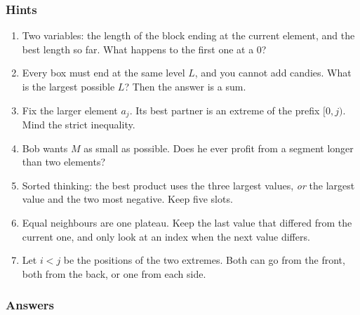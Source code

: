 \subsubsection*{Hints}
\begin{enumerate}[leftmargin=*, label=\textbf{E1.\arabic*}]
    \item Two variables: the length of the block ending at the current element, and the best length so far. What happens to the first one at a 0?
    \item Every box must end at the same level $L$, and you cannot add candies. What is the largest possible $L$? Then the answer is a sum.
    \item Fix the larger element $a_j$. Its best partner is an extreme of the prefix $[0, j)$. Mind the strict inequality.
    \item Bob wants $M$ as small as possible. Does he ever profit from a segment longer than two elements?
    \item Sorted thinking: the best product uses the three largest values, \emph{or} the largest value and the two most negative. Keep five slots.
    \item Equal neighbours are one plateau. Keep the last value that differed from the current one, and only look at an index when the next value differs.
    \item Let $i < j$ be the positions of the two extremes. Both can go from the front, both from the back, or one from each side.
\end{enumerate}

\subsubsection*{Answers}

